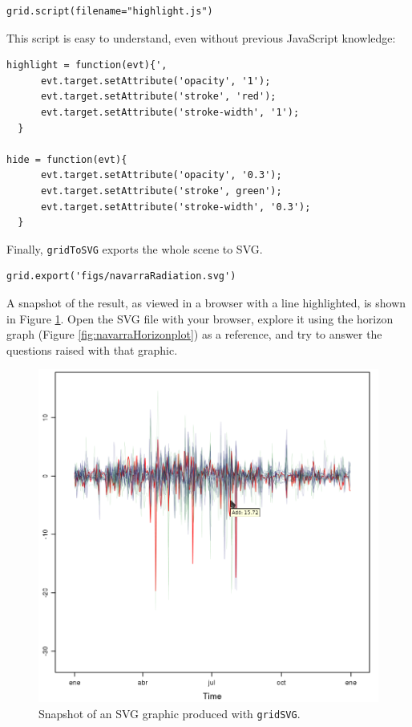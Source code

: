 \documentclass[smallroyalvopaper]{memoir}
\begin{document}

\lstset{language=r,label= ,caption= ,captionpos=b,numbers=none}
\begin{lstlisting}
grid.script(filename="highlight.js")
\end{lstlisting}

This script is easy to understand, even without previous
JavaScript knowledge:
\begin{verbatim}
highlight = function(evt){',
      evt.target.setAttribute('opacity', '1');
      evt.target.setAttribute('stroke', 'red');
      evt.target.setAttribute('stroke-width', '1');
  }
  
hide = function(evt){
      evt.target.setAttribute('opacity', '0.3');
      evt.target.setAttribute('stroke', green');
      evt.target.setAttribute('stroke-width', '0.3');
  }
\end{verbatim}

Finally, \texttt{gridToSVG} exports the whole scene to SVG. 


\lstset{language=r,label= ,caption= ,captionpos=b,numbers=none}
\begin{lstlisting}
grid.export('figs/navarraRadiation.svg')
\end{lstlisting}

A snapshot of the result, as viewed in a browser with a line
highlighted, is shown in Figure \ref{fig:navarraSVG}. Open the SVG
file with your browser, explore it using the horizon graph (Figure
\ref{fig:navarraHorizonplot}) as a reference, and try to answer the
questions raised with that graphic.

\begin{figure}[htbp]
\centering
\includegraphics[width=.9\linewidth]{figs/navarraSVG_captura.png}
\caption{Snapshot of an SVG graphic produced with \texttt{gridSVG}. \label{fig:navarraSVG}}
\end{figure}
\end{document}
